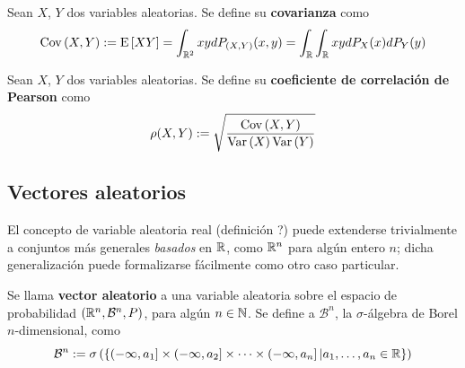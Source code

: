 
\begin{definicion}
Sean $X$, $Y$ dos variables aleatorias. Se define su \textbf{covarianza} como
\begin{equation}
\mathrm{Cov}\left( X,Y \right) := \mathrm{E}\left[ X Y \right] = \int_{\mathbb{R}^{2}} x y d P_{(X,Y)}(x,y) = \int_{\mathbb{R}} \int_{\mathbb{R}} x y dP_X(x) dP_Y(y)
\end{equation}
\end{definicion}


\begin{definicion}
Sean $X$, $Y$ dos variables aleatorias. Se define su \textbf{coeficiente de correlación de Pearson} como
\begin{equation}
\rho (X,Y) := \sqrt{\frac{\mathrm{Cov}\left( X,Y \right)}{\mathrm{Var}\left( X \right) \mathrm{Var}\left( Y \right)}}
\end{equation}
\end{definicion}


\subsection{Vectores aleatorios}

El concepto de variable aleatoria real (definición ?) puede extenderse trivialmente a conjuntos más generales \textit{basados} en $\mathbb{R}$, como $\mathbb{R}^{n}$ para algún entero $n$; dicha generalización puede formalizarse fácilmente como otro caso particular.

\begin{definicion}
Se llama \textbf{vector aleatorio} a una variable aleatoria sobre el espacio de probabilidad $(\mathbb{R}^{n},\mathcal{B}^{n},P)$, para algún $n\in \mathbb{N}$. Se define a $\mathcal{B}^{n}$, la $\sigma$-álgebra de Borel $n$-dimensional, como
\begin{equation}
\mathcal{B}^{n} := \sigma\left(\left\{ \left(-\infty, a_1\right]\times \left(-\infty, a_2\right]\times \cdots \times \left(-\infty, a_n\right] \lvert a_1, \dots, a_n \in \mathbb{R} \right\}\right)
\end{equation}
\end{definicion}

